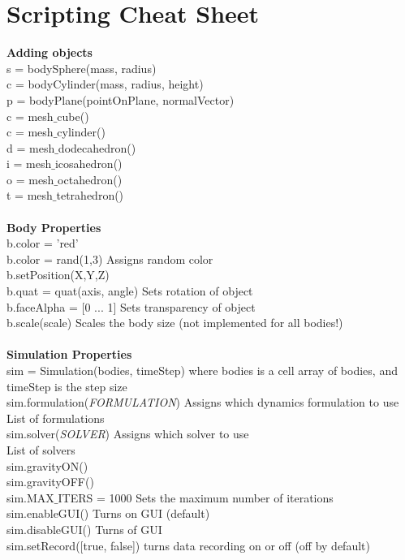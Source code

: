 \documentclass{article}
\newcommand{\tab}{\hspace*{2em}}
\begin{document}
\newpage
\section{Scripting Cheat Sheet}
\textbf{Adding objects} \\
s = bodySphere(mass, radius) \\
c = bodyCylinder(mass, radius, height) \\
p = bodyPlane(pointOnPlane, normalVector) \\
c = mesh$\_$cube()  \\
c = mesh$\_$cylinder()  \\
d = mesh$\_$dodecahedron()  \\
i = mesh$\_$icosahedron()  \\
o = mesh$\_$octahedron()  \\
t = mesh$\_$tetrahedron()  \\
\\
\textbf{Body Properties} \\
b.color = 'red'  \\
b.color = rand(1,3)   \tab Assigns random color \\
b.setPosition(X,Y,Z) \\
b.quat = quat(axis, angle)  \tab Sets rotation of object  \\
b.faceAlpha = [0 ... 1]   \tab Sets transparency of object \\
b.scale(scale)  \tab Scales the body size (not implemented for all bodies!) \\
\\
\textbf{Simulation Properties} \\
sim = Simulation(bodies, timeStep)  \tab where bodies is a cell array of bodies, and timeStep is the step size \\
sim.formulation(\emph{FORMULATION})   Assigns which dynamics formulation to use   \\
\tab List of formulations   \\
sim.solver(\emph{SOLVER}) \tab 	Assigns which solver to use   \\
\tab List of solvers   \\
sim.gravityON()   \\  
sim.gravityOFF()  \\
sim.MAX$\_$ITERS = 1000   \tab Sets the maximum number of iterations  \\
sim.enableGUI() 	\tab Turns on GUI (default)  \\
sim.disableGUI()  	\tab Turns of GUI  \\
sim.setRecord([true, false]) \tab turns data recording on or off (off by default)
\end{document}
